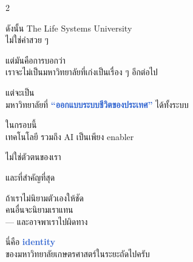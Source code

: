 \documentclass[10pt]{article}
\begin{document}
\begin{tcolorbox}[breakable,colback=panel,colframe=line,boxrule=0.5pt,arc=2mm,left=3mm,right=3mm,top=2mm,bottom=2mm]
\begin{multicols}{2}
\par ดังนั้น The Life Systems University\\ ไม่ใช่คำสวย ๆ
\par แต่มันคือการบอกว่า\\ เราจะไม่เป็นมหาวิทยาลัยที่เก่งเป็นเรื่อง ๆ อีกต่อไป
\par แต่จะเป็น\\ มหาวิทยาลัยที่ \textbf{\textcolor{highlight}{“ออกแบบระบบชีวิตของประเทศ”}} ได้ทั้งระบบ
\par ในกรอบนี้\\ เทคโนโลยี รวมถึง AI เป็นเพียง enabler
\par ไม่ใช่ตัวตนของเรา
\par และที่สำคัญที่สุด
\par ถ้าเราไม่นิยามตัวเองให้ชัด\\ คนอื่นจะนิยามเราแทน\\ — และอาจพาเราไปผิดทาง
\par นี่คือ \textbf{\textcolor{highlight}{identity}}\\ ของมหาวิทยาลัยเกษตรศาสตร์ในระยะถัดไปครับ
\end{multicols}
\end{tcolorbox}

\clearpage
\end{document}
